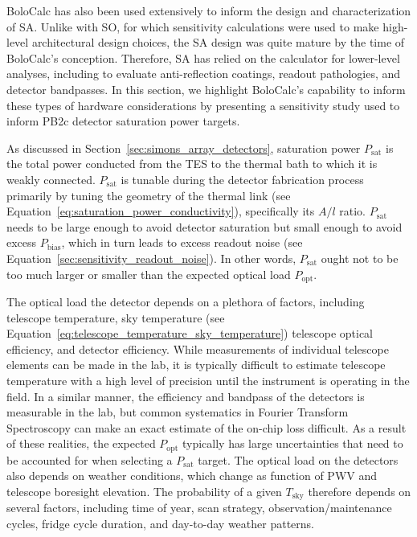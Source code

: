 BoloCalc has also been used extensively to inform the design and characterization of SA. Unlike with SO, for which sensitivity calculations were used to make high-level architectural design choices, the SA design was quite mature by the time of BoloCalc's conception. Therefore, SA has relied on the calculator for lower-level analyses, including to evaluate anti-reflection coatings, readout pathologies, and detector bandpasses. In this section, we highlight BoloCalc's capability to inform these types of hardware considerations by presenting a sensitivity study used to inform PB2c detector saturation power targets.

As discussed in Section~\ref{sec:simons_array_detectors}, saturation power $P_{\mathrm{sat}}$ is the total power conducted from the TES to the thermal bath to which it is weakly connected. $P_{\mathrm{sat}}$ is tunable during the detector fabrication process primarily by tuning the geometry of the thermal link (see Equation~\ref{eq:saturation_power_conductivity}), specifically its $A / l$ ratio. $P_{\mathrm{sat}}$ needs to be large enough to avoid detector saturation but small enough to avoid excess $P_{\mathrm{bias}}$, which in turn leads to excess readout noise (see Equation~\ref{sec:sensitivity_readout_noise}). In other words, $P_{\mathrm{sat}}$ ought not to be too much larger or smaller than the expected optical load $P_{\mathrm{opt}}$. 

The optical load the detector depends on a plethora of factors, including telescope temperature, sky temperature (see Equation~\ref{eq:telescope_temperature_sky_temperature}) telescope optical efficiency, and detector efficiency. While measurements of individual telescope elements can be made in the lab, it is typically difficult to estimate telescope temperature with a high level of precision until the instrument is operating in the field. In a similar manner, the efficiency and bandpass of the detectors is measurable in the lab, but common systematics in Fourier Transform Spectroscopy can make an exact estimate of the on-chip loss difficult. As a result of these realities, the expected $P_{\mathrm{opt}}$ typically has large uncertainties that need to be accounted for when selecting a $P_{\mathrm{sat}}$ target. The optical load on the detectors also depends on weather conditions, which change as function of PWV and telescope boresight elevation. The probability of a given $T_{\mathrm{sky}}$ therefore depends on several factors, including time of year, scan strategy, observation/maintenance cycles, fridge cycle duration, and day-to-day weather patterns.

